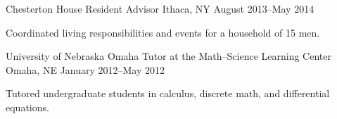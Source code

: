 \documentclass[11pt, letterpaper]{awesome-cv}
\begin{document}
\begin{cventries}

\cventry
	{Chesterton House}
	{Resident Advisor}
	{Ithaca, NY}
	{August 2013--May 2014}
	{
		\begin{cvitems}
			\item{Coordinated living responsibilities and events for a household of 15 men.}
		\end{cvitems}
	}

\cventry
	{University of Nebraska Omaha}
	{Tutor at the Math--Science Learning Center}
	{Omaha, NE}
	{January 2012--May 2012}
	{
		\begin{cvitems}
			\item{Tutored undergraduate students in calculus, discrete math, and differential equations.}
		\end{cvitems}
	}
	
\end{cventries}
\end{document}
